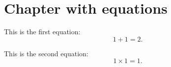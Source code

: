 \chapter{Chapter with equations}
\label{chap:chapter_1}

This is the first equation:
\begin{equation}
  1 + 1 = 2.
  \label{eq:1}
\end{equation}

\noindent
This is the second equation:
\begin{equation}
  1 \times 1 = 1.
  \label{eq:2}
\end{equation}
